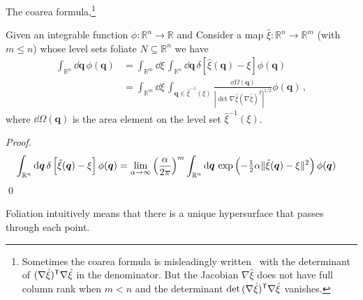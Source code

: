 The coarea formula,\footnote{Sometimes the coarea formula is misleadingly written~\cite{hartmann2007,hartmann2007a} with the determinant of $(\nabla\hat{\xi})^\mathsf{T}\nabla\hat{\xi}$ in the denominator.  But the Jacobian $\nabla\hat{\xi}$ does not have full column rank when $m < n$ and the determinant $\det\,(\nabla\hat{\xi})^\mathsf{T}\nabla\hat{\xi}$ vanishes.}
%
\begin{theorem}
  Given an integrable function $\phi: \mathbb{R}^n \to \mathbb{R}$ and
  Consider a map $\hat{\xi}: \mathbb{R}^n \to \mathbb{R}^m$ (with $m \leq n$) whose level sets foliate $N \subseteq \mathbb{R}^{n}$ we have
  \begin{equation}
    \begin{aligned}
      \int_{\mathbb{R}^n} \dd{\bm{q}}\, \phi(\bm{q}) &= \int_{\mathbb{R}^m} \dd{\xi}\,\int_{\mathbb{R}^n} \dd{\bm{q}}\, \delta\left[\hat{\xi}(\bm{q}) - \xi\right] \phi(\bm{q})\\
                                                     &= \int_{\mathbb{R}^m} \dd{\xi}\,\int_{\bm{q} \in \hat{\xi}^{-1}(\xi)} \frac{\dd{\Omega(\bm{q})}}{|\det \nabla\hat{\xi}(\nabla\hat{\xi})^T|^{1/2}} \phi(\bm{q})\,,
    \end{aligned}
  \end{equation}
  where $\dd\Omega(\bm{q})$ is the area element on the level set $\hat{\xi}^{-1}(\xi)$.
\end{theorem}
\begin{proof}
  \begin{equation}
    \begin{aligned}
      \int_{\mathbb{R}^{n}} \mathrm{d}\bm{q}\,\delta\left[\hat{\xi}(\bm{q}) - \xi\right] \phi(\bm{q}) &=
      \lim_{\alpha \to \infty} \left(\frac{\alpha}{2\pi}\right)^{m} \int_{\mathbb{R}^{n}} \mathrm{d}\bm{q}\, \exp\left(-\tfrac{1}{2}\alpha\lVert\hat{\xi}(\bm{q}) - \xi\rVert^{2}\right) \phi(\bm{q})
    \end{aligned}
  \end{equation}
  \qed
\end{proof}

Foliation intuitively means that there is a unique hypersurface that passes through each point.


